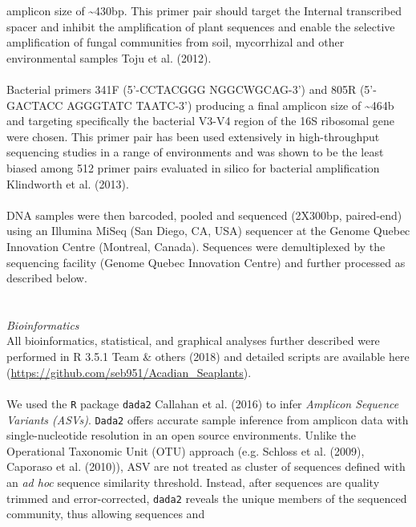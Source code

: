 \documentclass[11pt,]{article}
\begin{document}
amplicon size of \textasciitilde{}430bp. This primer pair should target
the Internal transcribed spacer and inhibit the amplification of plant
sequences and enable the selective amplification of fungal communities
from soil, mycorrhizal and other environmental samples Toju et al.
(2012).\\
\hspace*{0.333em}\\
Bacterial primers 341F (5'-CCTACGGG NGGCWGCAG-3') and 805R (5'-GACTACC
AGGGTATC TAATC-3') producing a final amplicon size of
\textasciitilde{}464b and targeting specifically the bacterial V3-V4
region of the 16S ribosomal gene were chosen. This primer pair has been
used extensively in high-throughput sequencing studies in a range of
environments and was shown to be the least biased among 512 primer pairs
evaluated in silico for bacterial amplification Klindworth et al.
(2013).\\
\hspace*{0.333em}\\
DNA samples were then barcoded, pooled and sequenced (2X300bp,
paired-end) using an Illumina MiSeq (San Diego, CA, USA) sequencer at
the Genome Quebec Innovation Centre (Montreal, Canada). Sequences were
demultiplexed by the sequencing facility (Genome Quebec Innovation
Centre) and further processed as described below.\\
\hspace*{0.333em}\\
\hspace*{0.333em}\\
\emph{Bioinformatics}\\
All bioinformatics, statistical, and graphical analyses further
described were performed in R 3.5.1 Team \& others (2018) and detailed
scripts are available here
(\url{https://github.com/seb951/Acadian_Seaplants}).\\
\hspace*{0.333em}\\
We used the \texttt{R} package \texttt{dada2} Callahan et al. (2016) to
infer \emph{Amplicon Sequence Variants (ASVs)}. \texttt{Dada2} offers
accurate sample inference from amplicon data with single-nucleotide
resolution in an open source environments. Unlike the Operational
Taxonomic Unit (OTU) approach (e.g. Schloss et al. (2009), Caporaso et
al. (2010)), ASV are not treated as cluster of sequences defined with an
\emph{ad hoc} sequence similarity threshold. Instead, after sequences
are quality trimmed and error-corrected, \texttt{dada2} reveals the
unique members of the sequenced community, thus allowing sequences and
\end{document}
